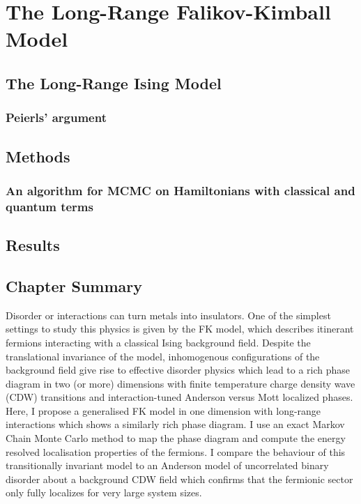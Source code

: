 \chapter{The Long-Range Falikov-Kimball Model}
\label{chapter:falikov_kimball_model}

\section{The Long-Range Ising Model}
    \subsection{Peierls' argument}

\section{Methods}
    \subsection{An algorithm for MCMC on Hamiltonians with classical and quantum terms}
\section{Results}

\section{Chapter Summary}
 Disorder or interactions can turn metals into insulators. One of the simplest settings to study this physics is given by the \ac{FK} model, which describes itinerant fermions interacting with a classical Ising background field. Despite the translational invariance of the model, inhomogenous configurations of the background field give rise to effective disorder physics which lead to a rich phase diagram in two (or more) dimensions with finite temperature charge density wave (CDW) transitions and interaction-tuned Anderson versus Mott localized phases. Here, I propose a generalised \ac{FK} model in one dimension with long-range interactions which shows a similarly rich phase diagram. I use an exact Markov Chain Monte Carlo method to map the phase diagram and compute the energy resolved localisation properties of the fermions. I compare the behaviour of this transitionally invariant model to an Anderson model of uncorrelated binary disorder about a background CDW field which confirms that the fermionic sector only fully localizes for very large system sizes.
 
